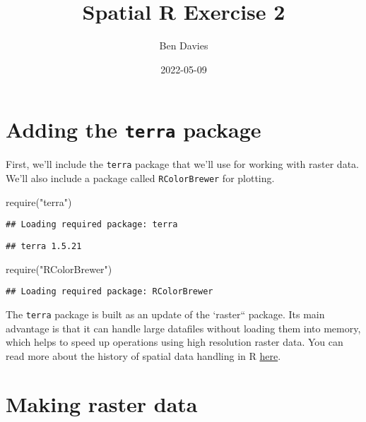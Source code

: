 \documentclass[
]{book}
\title{Spatial R Exercise 2}
\author{Ben Davies}
\date{2022-05-09}
\newenvironment{Shaded}{\begin{snugshade}}{\end{snugshade}}
\newcommand{\FunctionTok}[1]{\textcolor[rgb]{0.00,0.00,0.00}{#1}}
\newcommand{\NormalTok}[1]{#1}
\newcommand{\StringTok}[1]{\textcolor[rgb]{0.31,0.60,0.02}{#1}}
\begin{document}
\maketitle

{
\setcounter{tocdepth}{1}
\tableofcontents
}
\hypertarget{adding-the-terra-package}{%
\chapter{\texorpdfstring{Adding the \texttt{terra} package}{Adding the terra package}}\label{adding-the-terra-package}}

First, we'll include the \texttt{terra} package that we'll use for working with raster data. We'll also include a package called \texttt{RColorBrewer} for plotting.

\begin{Shaded}
\begin{Highlighting}[]
\FunctionTok{require}\NormalTok{(}\StringTok{"terra"}\NormalTok{)}
\end{Highlighting}
\end{Shaded}

\begin{verbatim}
## Loading required package: terra
\end{verbatim}

\begin{verbatim}
## terra 1.5.21
\end{verbatim}

\begin{Shaded}
\begin{Highlighting}[]
\FunctionTok{require}\NormalTok{(}\StringTok{"RColorBrewer"}\NormalTok{)}
\end{Highlighting}
\end{Shaded}

\begin{verbatim}
## Loading required package: RColorBrewer
\end{verbatim}

The \texttt{terra} package is built as an update of the `raster`` package. Its main advantage is that it can handle large datafiles without loading them into memory, which helps to speed up operations using high resolution raster data. You can read more about the history of spatial data handling in R \href{https://link.springer.com/article/10.1007/s10109-020-00336-0}{here}.

\hypertarget{making-raster-data}{%
\chapter{Making raster data}\label{making-raster-data}}
\end{document}
